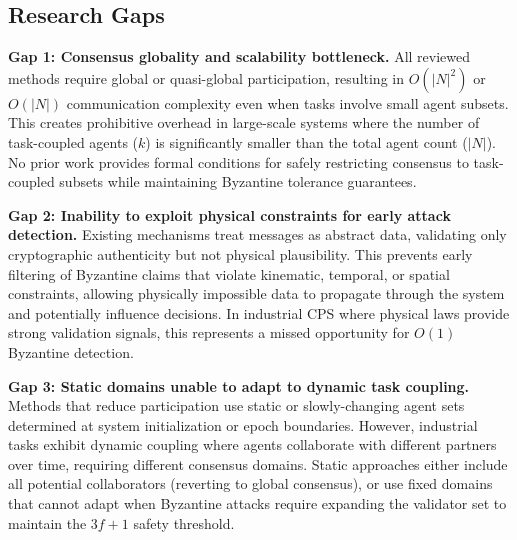 \documentclass[lettersize,journal]{IEEEtran}
\begin{document}
\subsection{Research Gaps}

\textbf{Gap 1: Consensus globality and scalability bottleneck.} All reviewed methods require global or quasi-global participation, resulting in $O(|N|^2)$ or $O(|N|)$ communication complexity even when tasks involve small agent subsets. 
This creates prohibitive overhead in large-scale systems where the number of task-coupled agents ($k$) is significantly smaller than the total agent count ($|N|$). 
No prior work provides formal conditions for safely restricting consensus to task-coupled subsets while maintaining Byzantine tolerance guarantees.

\textbf{Gap 2: Inability to exploit physical constraints for early attack detection.} Existing mechanisms treat messages as abstract data, validating only cryptographic authenticity but not physical plausibility. 
This prevents early filtering of Byzantine claims that violate kinematic, temporal, or spatial constraints, allowing physically impossible data to propagate through the system and potentially influence decisions. 
In industrial CPS where physical laws provide strong validation signals, this represents a missed opportunity for $O(1)$ Byzantine detection.

\textbf{Gap 3: Static domains unable to adapt to dynamic task coupling.} Methods that reduce participation use static or slowly-changing agent sets determined at system initialization or epoch boundaries. 
However, industrial tasks exhibit dynamic coupling where agents collaborate with different partners over time, requiring different consensus domains. Static approaches either include all potential collaborators (reverting to global consensus), 
or use fixed domains that cannot adapt when Byzantine attacks require expanding the validator set to maintain the $3f+1$ safety threshold.


\end{document}
